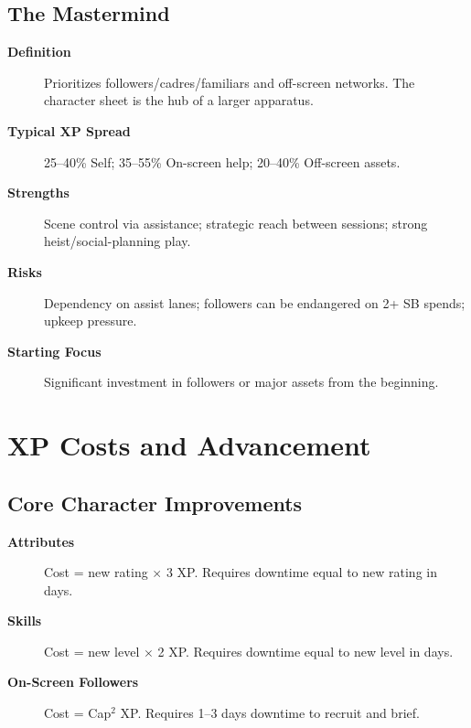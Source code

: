 \subsection{The Mastermind}
\label{subsec:mastermind-archetype}

\begin{description}
\item[\textbf{Definition}] Prioritizes followers/cadres/familiars and off-screen networks. The character sheet is the hub of a larger apparatus.
\item[\textbf{Typical XP Spread}] 25--40\% Self; 35--55\% On-screen help; 20--40\% Off-screen assets.
\item[\textbf{Strengths}] Scene control via assistance; strategic reach between sessions; strong heist/social-planning play.
\item[\textbf{Risks}] Dependency on assist lanes; followers can be endangered on 2+ SB spends; upkeep pressure.
\item[\textbf{Starting Focus}] Significant investment in followers or major assets from the beginning.
\end{description}

\section{XP Costs and Advancement}
\label{sec:xp-costs}

\subsection{Core Character Improvements}
\label{subsec:core-improvements}

\begin{description}
\item[\textbf{Attributes}] Cost = new rating $\times$ 3 XP. Requires downtime equal to new rating in days.
\item[\textbf{Skills}] Cost = new level $\times$ 2 XP. Requires downtime equal to new level in days.
\item[\textbf{On-Screen Followers}] Cost = Cap$^{2}$ XP. Requires 1--3 days downtime to recruit and brief.
\end{description}

